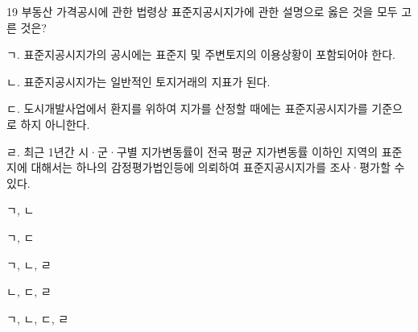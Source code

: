 \begin{question}{19}
부동산 가격공시에 관한 법령상 표준지공시지가에 관한 설명으로 옳은 것을 모두 고른 것은?
\begin{framedtext}
ㄱ. 표준지공시지가의 공시에는 표준지 및 주변토지의 이용상황이 포함되어야 한다. \par
ㄴ. 표준지공시지가는 일반적인 토지거래의 지표가 된다. \par
ㄷ. 도시개발사업에서 환지를 위하여 지가를 산정할 때에는 표준지공시지가를 기준으로 하지 아니한다. \par
ㄹ. 최근 1년간 시·군·구별 지가변동률이 전국 평균 지가변동률 이하인 지역의 표준지에 대해서는 하나의 감정평가법인등에 의뢰하여 표준지공시지가를 조사·평가할 수 있다. \par
\end{framedtext}
\begin{choices}
  \item ㄱ, ㄴ
  \item ㄱ, ㄷ
  \item ㄱ, ㄴ, ㄹ
  \item ㄴ, ㄷ, ㄹ
  \item ㄱ, ㄴ, ㄷ, ㄹ
\end{choices}
\end{question}
